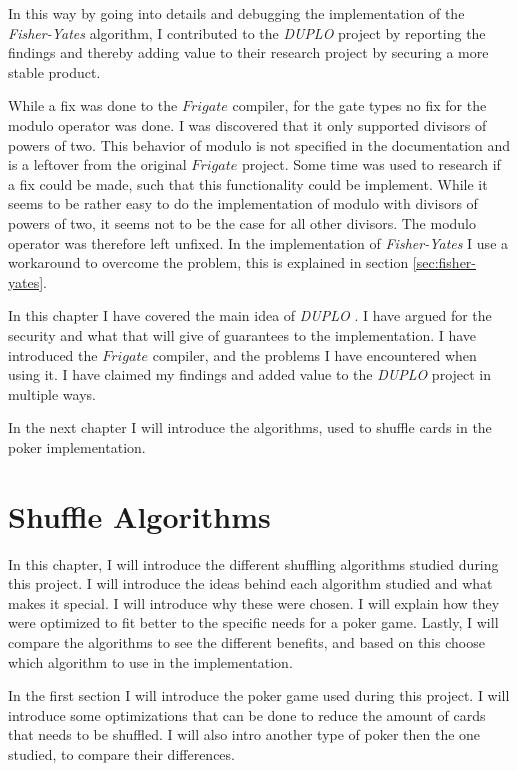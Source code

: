 \documentclass[twoside,11pt,openright]{report}
\newcommand{\FY}{\textit{Fisher-Yates} }
\newcommand{\DUPLO}{\textit{DUPLO} }
\begin{document}
In this way by going into details and debugging the implementation of the \FY algorithm, I contributed to the \DUPLO project by reporting the findings and thereby adding value to their research project by securing a more stable product.

While a fix was done to the $Frigate$ compiler, for the gate types no fix for the modulo operator was done. I was discovered that it only supported divisors of powers of two. This behavior of modulo is not specified in the documentation and is a leftover from the original $Frigate$ project. Some time was used to research if a fix could be made, such that this functionality could be implement. While it seems to be rather easy to do the implementation of modulo with divisors of powers of two, it seems not to be the case for all other divisors. The modulo operator was therefore left unfixed. In the implementation of \FY I use a workaround to overcome the problem, this is explained in section \ref{sec:fisher-yates}.

\bigskip

In this chapter I have covered the main idea of \DUPLO. I have argued for the security and what that will give of guarantees to the implementation. I have introduced the $Frigate$ compiler, and the problems I have encountered when using it. I have claimed my findings and added value to the \DUPLO project in multiple ways.

In the next chapter I will introduce the algorithms, used to shuffle cards in the poker implementation.


\chapter{Shuffle Algorithms}
\label{ch:shuffle}
In this chapter, I will introduce the different shuffling algorithms studied during this project. I will introduce the ideas behind each algorithm studied and what makes it special. I will introduce why these were chosen. I will explain how they were optimized to fit better to the specific needs for a poker game. Lastly, I will compare the algorithms to see the different benefits, and based on this choose which algorithm to use in the implementation.

In the first section I will introduce the poker game used during this project. I will introduce some optimizations that can be done to reduce the amount of cards that needs to be shuffled. I will also intro another type of poker then the one studied, to compare their differences.
\end{document}
